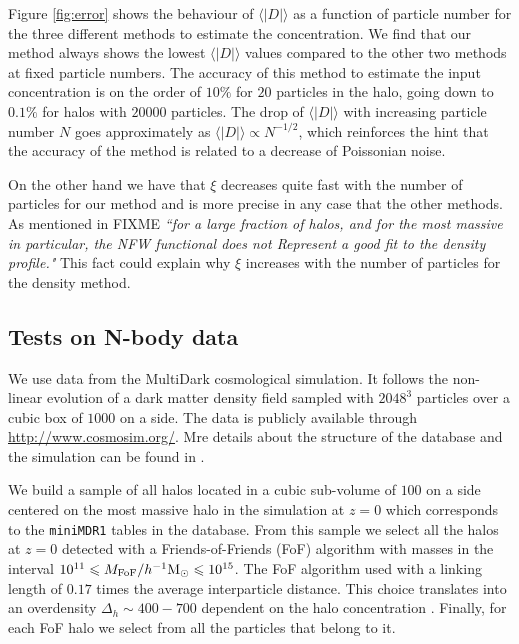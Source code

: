 \documentclass[useAMS,usenatbib]{mn2e}
\newcommand{\avg}[1]{\langle{#1}\rangle}
\newcommand{\hMpc}{{\ifmmode{h^{-1}{\rm Mpc}}\else{$h^{-1}$Mpc }\fi}}
\newcommand{\hMsun}{{\ifmmode{h^{-1}{\rm
        {M_{\odot}}}}\else{$h^{-1}{\rm{M_{\odot}}}$~}\fi}}
\begin{document}
Figure \ref{fig:error} shows the behaviour of $\avg{|D|}$ as a function of
particle number for the three different methods to estimate the
concentration. 
We find that our method always shows the lowest $\avg{|D|}$ values compared
to the other two methods at fixed particle numbers. 
The accuracy of this method to estimate the input concentration is on
the order of $10\%$ for $20$ particles in the halo, going down to
$0.1\%$ for halos with $20000$ particles. 
The drop of $\avg{|D|}$ with increasing particle number $N$ goes
approximately as $\avg{|D|}\propto N^{-1/2}$, which reinforces the hint that
the accuracy of the method is related to a decrease of Poissonian
noise.
 



On the other hand we have that
$\xi$ decreases quite fast with the number of particles for our method
and is more precise in any case that the other methods. As mentioned
in FIXME \textit{``for a large fraction of halos, and for the most
  massive in particular, the NFW functional does not Represent a good
  fit to the density profile."} This fact could explain why $\xi$
increases with the number of particles for the density method. 





\subsection{Tests on N-body data}
\label{sec:data}

We use data from the MultiDark cosmological simulation. 
It follows the non-linear evolution of a dark matter density field
sampled with $2048^3$ particles over a cubic box of $1000$ \hMpc on a side. 
The data is publicly available through \url{http://www.cosmosim.org/}.
Mre details about the structure of the database and the simulation
can be found in \citep{2013AN....334..691R}. 

We build a sample of all halos located in a cubic sub-volume of $100$
\hMpc on a side centered on the most massive halo in the simulation at
$z=0$ which corresponds to the \texttt{miniMDR1} tables in the
database.   
From this sample we select all the halos at $z=0$ detected with a
Friends-of-Friends (FoF) algorithm with masses in the interval
$10^{11}\leq M_{\rm FoF}/\hMsun \leq 10^{15}$. 
The FoF algorithm used with a linking length of $0.17$ times the average
interparticle distance. This choice translates into an overdensity
$\Delta_h\sim 400-700$ dependent on the halo concentration
\citep{More2011}. 
Finally, for each FoF halo we select from all the particles that
belong to it.   
\end{document}
